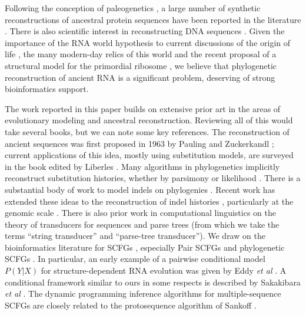 \documentclass[10pt]{article}
\begin{document}
Following the conception of paleogenetics \cite{PaulingZuckerkandl63},
a large number of synthetic reconstructions of ancestral protein sequences have been
reported in the literature
\cite{MalcolmEtAl90,StackhouseEtAl90,ZhangRosenberg2002,GaucherEtAl2003,ThomsonEtAl2005,ChangEtAl2002,SunEtAl2002,OrtlundEtAl2007}.
There is also scientific interest in reconstructing DNA sequences
\cite{IvicsEtAl91,AdeyEtAl94,BlanchetteEtAl2004,NoonanEtAl2006,Gaucher2007b,EliasTuller2007,PatenHolmesBirney2008}.
Given the importance of the RNA world hypothesis to
current discussions of the origin of life \cite{MarintchevWagner2004,Muller2005,CavalierSmith2006,WilliamKoonin2006,Forterre2006,Yakhnin2007,DanchinEtAl2007},
the many modern-day relics of this world
 \cite{LeeEtAl93,LoweEddy99,Eddy01,MandalEtAl2003}
and the recent proposal of a structural model for the primordial ribosome
 \cite{SmithEtAl2008},
we believe that phylogenetic reconstruction of ancient RNA is a significant
problem, deserving of strong bioinformatics support.


The work reported in this paper builds on extensive prior art in the areas of evolutionary modeling and ancestral reconstruction.
Reviewing all of this would take several books, but we can note some key references.
The reconstruction of ancient sequences was first proposed in 1963 by Pauling and Zuckerkandl \cite{PaulingZuckerkandl63};
current applications of this idea, mostly using substitution models, are surveyed in the book edited by Liberles \cite{Liberles2007}.
Many algorithms in phylogenetics implicitly reconstruct substitution histories,
whether by parsimony \cite{Edwards63,HendyPenny82} or likelihood \cite{Felsenstein81}.
There is a substantial body of work to model indels on phylogenies
\cite{ThorneEtal91,HeinEtal2000,Hein2001,HolmesBruno2001,SteelHein2001,Holmes2003,KnudsenMiyamoto2003,LunterSongMiklosHein2003,MiklosLunterHolmes2004,LunterEtAl2004,BradleyHolmes2007,SatijaEtAl2008}.
Recent work has extended these ideas to the reconstruction of indel
histories \cite{KimSinha2007,DialloEtAl2007},
particularly at the genomic scale \cite{MillerHausslerEtAl2006,PatenHolmesBirney2008}.
There is also prior work in computational linguistics
on the theory of transducers for sequences \cite{MohriPereiraRiley2000}
and parse trees \cite{Rounds70,Thatcher70,GecsegSteinby97,ComonEtAl2007-TreeTransducers}
(from which we take the terms ``string transducer'' and ``parse-tree transducer'').
We draw on the bioinformatics literature for SCFGs
\cite{Eddy94,Sakakibara94c,Durbin98},
especially Pair SCFGs \cite{RivasEddy99,Holmes2005,DowellEddy2006}
and phylogenetic SCFGs \cite{KnudsenHein2003}.
In particular, an early example of a pairwise conditional model $P(Y|X)$ for structure-dependent RNA evolution
was given by Eddy {\em et al} \cite{KleinEddy2003}.
A conditional framework similar to ours in some respects is described
by Sakakibara {\em et al} \cite{Sakakibara2003}.
The dynamic programming inference algorithms for multiple-sequence SCFGs are closely related to the protosequence algorithm of Sankoff \cite{Sankoff85}.
\end{document}

